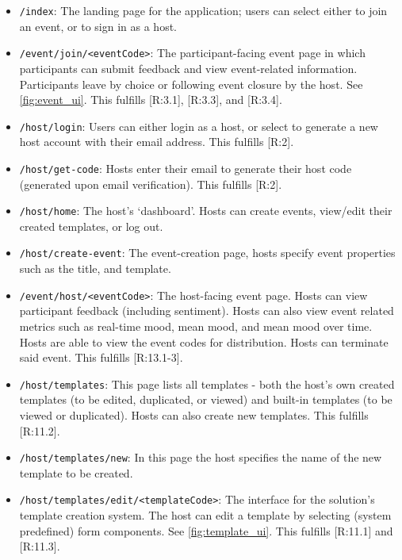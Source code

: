 \documentclass[9pt, titlepage]{extarticle}
\begin{document}
\begin{itemize}[noitemsep]
    \item \texttt{/index}: The landing page for the application; users can select either to join an event, or to sign in as a host.
    \item \texttt{/event/join/<eventCode>}: The participant-facing event page in which participants can submit feedback and view event-related information. Participants leave by choice or following event closure by the host. See \autoref{fig:event_ui}. This fulfills [R:3.1], [R:3.3], and [R:3.4].
    \item \texttt{/host/login}: Users can either login as a host, or select to generate a new host account with their email address. This fulfills [R:2].
    \item \texttt{/host/get-code}: Hosts enter their email to generate their host code  (generated upon email verification). This fulfills [R:2].
    \item \texttt{/host/home}: The host's `dashboard'. Hosts can create events, view/edit their created templates, or log out.
    \item \texttt{/host/create-event}: The event-creation page, hosts specify event properties such as the title, and template.
    \item \texttt{/event/host/<eventCode>}: The host-facing event page. Hosts can view participant feedback (including sentiment). Hosts can also view event related metrics such as real-time mood, mean mood, and mean mood over time. Hosts are able to view the event codes for distribution. Hosts can terminate said event. This fulfills [R:13.1-3].
    \item \texttt{/host/templates}: This page lists all templates - both the host's own created templates (to be edited, duplicated, or viewed) and built-in templates (to be viewed or duplicated). Hosts can also create new templates. This fulfills [R:11.2].
    \item \texttt{/host/templates/new}: In this page the host specifies the name of the new template to be created.
    \item \texttt{/host/templates/edit/<templateCode>}: The interface for the solution's template creation system. The host can edit a template by selecting (system predefined) form components. See \autoref{fig:template_ui}. This fulfills [R:11.1] and [R:11.3].
\end{itemize}
\end{document}
